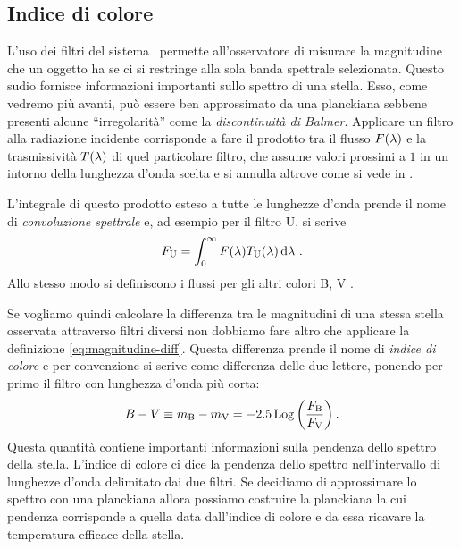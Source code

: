     \subsection{Indice di colore}
        L'uso dei filtri del sistema \ubvri\ permette all'osservatore di misurare la magnitudine che un oggetto ha se ci si restringe alla sola banda spettrale selezionata. Questo sudio fornisce informazioni importanti sullo spettro di una stella. Esso, come vedremo più avanti, può essere ben approssimato da una planckiana sebbene presenti alcune ``irregolarità'' come la \emph{discontinuità di Balmer}. Applicare un filtro alla radiazione incidente corrisponde a fare il prodotto tra il flusso $F\pqty{\lambda}$ e la trasmissività $T\pqty{\lambda}$ di quel particolare filtro, che assume valori prossimi a $\num{1}$ in un intorno della lunghezza d'onda scelta e si annulla altrove come si vede in .

        L'integrale di questo prodotto esteso a tutte le lunghezze d'onda prende il nome di \emph{convoluzione spettrale} e, ad esempio per il filtro U, si scrive
        \begin{equation*}
            F_{\text{U}} = \int_{0}^{\infty} F\pqty{\lambda}T_{\text{U}}\pqty{\lambda}\dd{\lambda}
            \myperiod
        \end{equation*}
        Allo stesso modo si definiscono i flussi per gli altri colori B, V \myetc.

        Se vogliamo quindi calcolare la differenza tra le magnitudini di una stessa stella osservata attraverso filtri diversi non dobbiamo fare altro che applicare la definizione \eqref{eq:magnitudine-diff}. Questa differenza prende il nome di \emph{indice di colore} e per convenzione si scrive come differenza delle due lettere, ponendo per primo il filtro con lunghezza d'onda più corta:
        \begin{equation}
            B - V \equiv m_{\text{B}} - m_{\text{V}} = -\num{2.5}\Log\pqty{\frac{F_{\text{B}}}{F_{\text{V}}}}
            \myperiod
        \end{equation}
        Questa quantità contiene importanti informazioni sulla pendenza dello spettro della stella. L'indice di colore ci dice la pendenza dello spettro nell'intervallo di lunghezze d'onda delimitato dai due filtri. Se decidiamo di approssimare lo spettro con una planckiana allora possiamo costruire la planckiana la cui pendenza corrisponde a quella data dall'indice di colore e da essa ricavare la temperatura efficace della stella.
